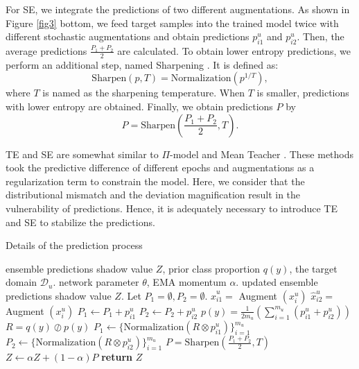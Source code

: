 \documentclass[a4paper,fleqn]{cas-dc}
\begin{document}
	For SE, we integrate the predictions of two different augmentations. As shown in Figure \ref{fig3} bottom, we feed target samples into the trained model twice with different stochastic augmentations and obtain predictions $p_{i1}^u$ and $p_{i2}^u$. Then, the average predictions $\frac{P_1+P_2}{2}$ are calculated. To obtain lower entropy predictions, we perform an additional step, named Sharpening \cite{berthelot2019mixmatch,berthelot2019remixmatch}. It is defined as:
	\begin{equation}
		\text{Sharpen}(p, T) = \text{Normalization}(p^{1/T}),
	\end{equation}
	where $T$ is named as the sharpening temperature. When $T$ is smaller, predictions with lower entropy are obtained. Finally, we obtain predictions $P$ by
	\begin{equation}\label{eq5}
		P = \text{Sharpen}(\frac{P_1+P_2}{2}, T).
	\end{equation}
	
	TE and SE are somewhat similar to $\Pi$-model \cite{laine2016temporal} and Mean Teacher \cite{DBLP:conf/iclr/FrenchMF18,DBLP:conf/iclr/TarvainenV17}. These methods took the predictive difference of different epochs and augmentations as a regularization term to constrain the model. Here, we consider that the distributional mismatch and the deviation magnification result in the vulnerability of predictions. Hence, it is adequately necessary to introduce TE and SE to stabilize the predictions.
	
	\begin{algorithm}
		\small
		\caption{Details of the prediction process}
		\label{algorithm2}
		\begin{algorithmic}[1]
			\Require ensemble predictions shadow value $Z$, prior class proportion $q(y)$, the target domain $\mathcal{D}_{u}$. network parameter $\theta$,  EMA momentum $\alpha$.
			\Ensure updated ensemble predictions shadow value $Z$.
			\State Let $P_1=\emptyset, P_2=\emptyset$.
			\State $\hat{x}_{i1}^u =$ Augment $(x_i^u)$
			\State $\hat{x}_{i2}^u =$ Augment $(x_i^u)$
			\State $P_1 \leftarrow P_1 + p_{i1}^u$ 
			\State $P_2 \leftarrow P_2 + p_{i2}^u$ 
			\EndFor
			\State $p(y) = \frac{1}{2m_u}(\sum_{i=1}^{m_u}(p_{i1}^u + p_{i2}^u))$
			\State $R = q(y) \oslash p(y)$
			\State $P_1 \leftarrow \{\text{Normalization}(R \otimes p_{i1}^u)\}_{i=1}^{m_u}$
			\State $P_2 \leftarrow \{\text{Normalization}(R \otimes p_{i2}^u)\}_{i=1}^{m_u}$
			\State $P = \text{Sharpen}(\frac{P_1+P_2}{2}, T)$
			\State $Z \leftarrow \alpha Z + (1-\alpha)P$
			\State \textbf{return} $Z$
		\end{algorithmic}
	\end{algorithm}
	
\end{document}
